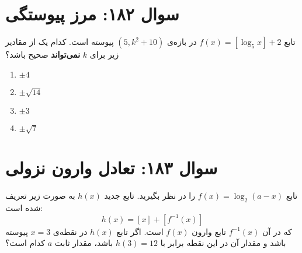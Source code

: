 \documentclass[12pt]{article}
\begin{document}
\vspace{1cm}
\hrulefill
\vspace{1cm}

\section*{سوال ۱۸۲: مرز پیوستگی}
تابع \( f(x) = [\log_5 x] + 2 \) در بازه‌ی \( (5, k^2+10) \) پیوسته است. کدام یک از مقادیر زیر برای \(k\) \textbf{نمی‌تواند} صحیح باشد؟
\begin{enumerate}[label=(\arabic*)]
	\item \( \pm 4 \)
	\item \( \pm \sqrt{14} \)
	\item \( \pm 3 \)
	\item \( \pm \sqrt{7} \)
\end{enumerate}

\vspace{1cm}
\hrulefill
\vspace{1cm}

\section*{سوال ۱۸۳: تعادل وارون نزولی}
تابع \(f(x) = \log_2(a-x)\) را در نظر بگیرید. تابع جدید \(h(x)\) به صورت زیر تعریف شده است:
\begin{displaymath}
	h(x) = [x] + [f^{-1}(x)]
\end{displaymath}
که در آن \(f^{-1}(x)\) تابع وارون \(f(x)\) است. اگر تابع \(h(x)\) در نقطه‌ی \(x=3\) پیوسته باشد و مقدار آن در این نقطه برابر با \(h(3)=12\) باشد، مقدار ثابت \(a\) کدام است؟

\vspace{1cm}
\hrulefill
\vspace{1cm}
\end{document}
